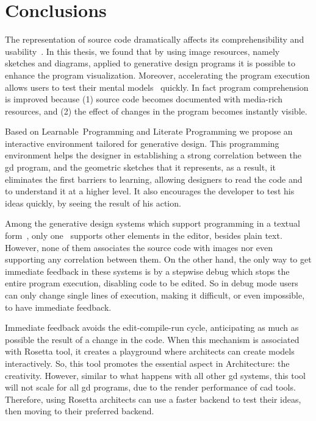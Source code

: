 
\section{Conclusions}
\label{chapter:conclusion}

The representation of source code dramatically affects its comprehensibility and usability~\cite{baecker1986design}. In this thesis, we found that by using image resources, namely sketches and diagrams, applied to generative design programs it is possible to enhance the program visualization. Moreover, accelerating the program execution allows users to test their mental models~\cite{brooks1977towards,robins2003learning} quickly. In fact program comprehension is improved because (1) source code becomes documented with media-rich resources, and (2) the effect of changes in the program becomes instantly visible.

Based on Learnable~Programming and Literate Programming we propose an interactive environment tailored for generative design. This programming environment helps the designer in establishing a strong correlation between the \gls{gd} program, and the geometric sketches that it represents, as a result, it eliminates the first barriers to learning, allowing designers to read the code and to understand it at a higher level. It also encourages the developer to test his ideas quickly, by seeing the result of his action.

Among the generative design systems which support programming in a textual form~\cite{aish2012designscript,lopes2011portable}, only one~\cite{lopes2011portable} supports other elements in the editor, besides plain text. However, none of them associates the source code with images nor even supporting any correlation between them. On the other hand, the only way to get immediate feedback in these systems is by a stepwise debug which stops the entire program execution, disabling code to be edited. So in debug mode users can only change single lines of execution, making it difficult, or even impossible, to have immediate feedback.

Immediate feedback avoids the edit-compile-run cycle, anticipating as much as possible the result of a change in the code. When this mechanism is associated with Rosetta tool, it creates a playground where architects can create models interactively. So, this tool promotes the essential aspect in Architecture: the creativity.  However, similar to what happens with all other \gls{gd} systems, this tool will not scale for all \gls{gd} programs, due to the render performance of \gls{cad} tools. Therefore, using Rosetta architects can use a faster backend to test their ideas, then moving to their preferred backend.


